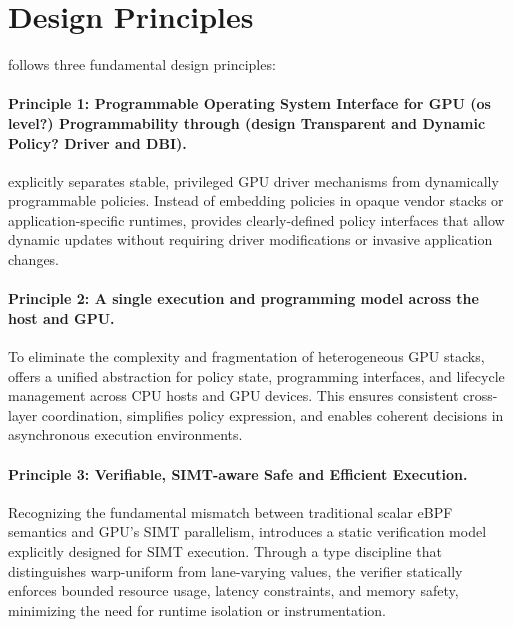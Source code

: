 \section{Design Principles}

\sys follows three fundamental design principles:

\paragraph{Principle 1: Programmable Operating System Interface for GPU (os level?)  Programmability through (design Transparent and Dynamic Policy? Driver and DBI).}
\sys explicitly separates stable, privileged GPU driver mechanisms from dynamically programmable policies. Instead of embedding policies in opaque vendor stacks or application-specific runtimes, \sys provides clearly-defined policy interfaces that allow dynamic updates without requiring driver modifications or invasive application changes.

\paragraph{Principle 2: A single execution and programming model across the host and GPU.}
To eliminate the complexity and fragmentation of heterogeneous GPU stacks, \sys offers a unified abstraction for policy state, programming interfaces, and lifecycle management across CPU hosts and GPU devices. This ensures consistent cross-layer coordination, simplifies policy expression, and enables coherent decisions in asynchronous execution environments.

\paragraph{Principle 3: Verifiable, SIMT-aware Safe and Efficient Execution.}
Recognizing the fundamental mismatch between traditional scalar eBPF semantics and GPU's SIMT parallelism, \sys introduces a static verification model explicitly designed for SIMT execution. Through a type discipline that distinguishes warp-uniform from lane-varying values, the verifier statically enforces bounded resource usage, latency constraints, and memory safety, minimizing the need for runtime isolation or instrumentation.

